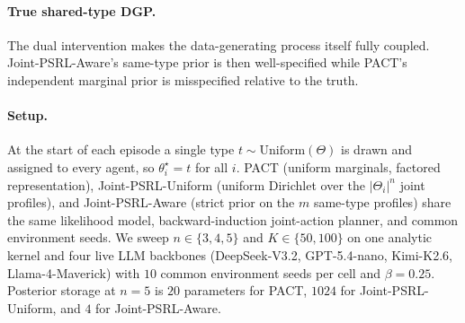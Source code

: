 \paragraph{True shared-type DGP.}
The dual intervention makes the data-generating process itself fully coupled. Joint-PSRL-Aware's same-type prior is then well-specified while PACT's independent marginal prior is misspecified relative to the truth.

\paragraph{Setup.} At the start of each episode a single type $t \sim \mathrm{Uniform}(\Theta)$ is drawn and assigned to every agent, so $\theta_i^\star = t$ for all $i$. PACT (uniform marginals, factored representation), Joint-PSRL-Uniform (uniform Dirichlet over the $|\Theta_i|^n$ joint profiles), and Joint-PSRL-Aware (strict prior on the $m$ same-type profiles) share the same likelihood model, backward-induction joint-action planner, and common environment seeds. We sweep $n\!\in\!\{3,4,5\}$ and $K\!\in\!\{50,100\}$ on one analytic kernel and four live LLM backbones (DeepSeek-V3.2, GPT-5.4-nano, Kimi-K2.6, Llama-4-Maverick) with $10$ common environment seeds per cell and $\beta{=}0.25$. Posterior storage at $n{=}5$ is $20$ parameters for PACT, $1024$ for Joint-PSRL-Uniform, and $4$ for Joint-PSRL-Aware.

